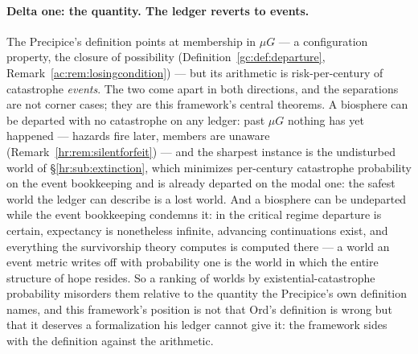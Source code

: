 \documentclass[11pt]{article}
\numberwithin{equation}{section}
\theoremstyle{plain}
\theoremstyle{definition}
\theoremstyle{remark}
\begin{document}
\paragraph{Delta one: the quantity. The ledger reverts to events.}
The Precipice's definition points at membership in $\mu G$ --- a
configuration property, the closure of possibility
(Definition~\ref{gc:def:departure},
Remark~\ref{ac:rem:losingcondition}) --- but its arithmetic is
risk-per-century of catastrophe \emph{events}. The two come apart in
both directions, and the separations are not corner cases; they are
this framework's central theorems. A biosphere can be departed with no
catastrophe on any ledger: past $\mu G$ nothing has yet happened ---
hazards fire later, members are unaware
(Remark~\ref{hr:rem:silentforfeit}) --- and the sharpest instance is
the undisturbed world of \S\ref{hr:sub:extinction}, which minimizes
per-century catastrophe probability on the event bookkeeping and is
already departed on the modal one: the safest world the ledger can
describe is a lost world. And a biosphere can be undeparted while the
event bookkeeping condemns it: in the critical regime departure is
certain, expectancy is nonetheless infinite, advancing continuations
exist, and everything the survivorship theory computes is computed
there --- a world an event metric writes off with probability one is
the world in which the entire structure of hope resides. So a ranking
of worlds by existential-catastrophe probability misorders them
relative to the quantity the Precipice's own definition names, and
this framework's position is not that Ord's definition is wrong but
that it deserves a formalization his ledger cannot give it: the
framework sides with the definition against the arithmetic.
\end{document}
